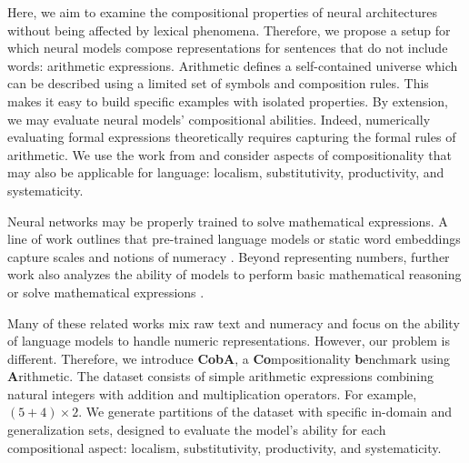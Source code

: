Here, we aim to examine the compositional properties of neural architectures without being affected by lexical phenomena. Therefore, we propose a setup for which neural models compose representations for sentences that do not include words: arithmetic expressions. Arithmetic defines a self-contained universe which can be described using a limited set of symbols and composition rules. This makes it easy to build specific examples with isolated properties. By extension, we may evaluate neural models’ compositional abilities. Indeed, numerically evaluating formal expressions theoretically requires capturing the formal rules of arithmetic. We use the work from \textcite{hupkes_20} and consider aspects of compositionality that may also be applicable for language: localism, substitutivity, productivity, and systematicity.

Neural networks may be properly trained to solve mathematical expressions. A line of work outlines that pre-trained language models or static word embeddings capture scales and notions of numeracy \parencite{wallace_19, naik_19, sundararaman_20, zhang_20, thawani_21}. Beyond representing numbers, further work also analyzes the ability of models to perform basic mathematical reasoning \parencite{saxton_19, dua_19, geva_20} or solve mathematical expressions \parencite{lample_20}.

Many of these related works mix raw text and numeracy and focus on the ability of language models to handle numeric representations. However, our problem is different. Therefore, we introduce \textbf{CobA}, a \textbf{Co}mpositionality \textbf{b}enchmark using \textbf{A}rithmetic. The dataset consists of simple arithmetic expressions combining natural integers with addition and multiplication operators. For example, $(5 + 4) \times 2$. We generate partitions of the dataset with specific in-domain and generalization sets, designed to evaluate the model's ability for each compositional aspect: localism, substitutivity, productivity, and systematicity. 



